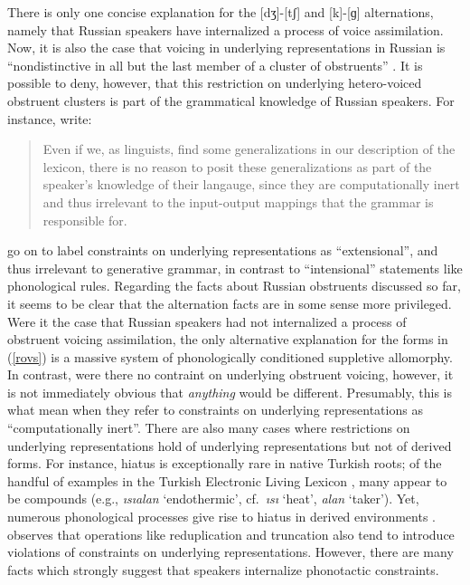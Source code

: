 There is only one concise explanation for the [dʒ]-[tʃ] and [k]-[ɡ] alternations, namely that Russian speakers have internalized a process of voice assimilation.
Now, it is also the case that voicing in underlying representations in Russian is ``nondistinctive in all but the last member of a cluster of obstruents'' \citep[283]{A74}.
It is possible to deny, however, that this restriction on underlying hetero-voiced obstruent clusters is part of the grammatical knowledge of Russian speakers. 
For instance, \citeauthor{PE} write:

\begin{quote}
Even if we, as linguists, find some generalizations in our description of the lexicon, there is no reason to posit these generalizations as part of the speaker's knowledge of their langauge, since they are computationally inert and thus irrelevant to the input-output mappings that the grammar is responsible for. \citep[17f.]{PE}
\end{quote}

\noindent
\citeauthor{PE} go on to label constraints on underlying representations as ``extensional'', and thus irrelevant to generative grammar, in contrast to ``intensional'' statements like phonological rules.
Regarding the facts about Russian obstruents discussed so far, it seems to be clear that the alternation facts are in some sense more privileged.
Were it the case that Russian speakers had not internalized a process of obstruent voicing assimilation, the only alternative explanation for the forms in (\ref{rovs}) is a massive system of phonologically conditioned suppletive allomorphy.
In contrast, were there no contraint on underlying obstruent voicing, however, it is not immediately obvious that \emph{anything} would be different. 
Presumably, this is what \citeauthor{PE} mean when they refer to constraints on underlying representations as ``computationally inert''.
There are also many cases where restrictions on underlying representations hold of underlying representations but not of derived forms.
For instance, hiatus is exceptionally rare in native Turkish roots; of the handful of examples in the Turkish Electronic Living Lexicon \citep{TELL}, many appear to be compounds (e.g., \emph{ısıalan} `endothermic', cf.~\emph{ısı} `heat', \emph{alan} `taker').
Yet, numerous phonological processes give rise to hiatus in derived environments \citep[e.g.,][]{Kabak2007b}.
\citet{Silverman2000} observes that operations like reduplication and truncation also tend to introduce violations of constraints on underlying representations.
However, there are many facts which strongly suggest that speakers internalize phonotactic constraints.

